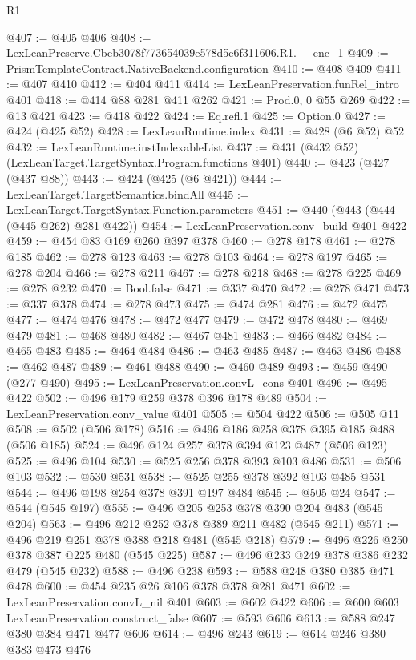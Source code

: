 \begin{lexlean}{R1}
\begin{coremodule}
@407 := @405 @406
@408 := LexLeanPreserve.Cbeb3078f773654039e578d5e6f311606.R1.__enc_1
@409 := PrismTemplateContract.NativeBackend.configuration
@410 := @408 @409
@411 := @407 @410
@412 := @404 @411
@414 := LexLeanPreservation.funRel_intro @401
@418 := @414 @88 @281 @411 @262
@421 := Prod.{0, 0} @55 @269
@422 := @13 @421
@423 := @418 @422
@424 := Eq.refl.{1}
@425 := Option.{0}
@427 := @424 (@425 @52)
@428 := LexLeanRuntime.index
@431 := @428 (@6 @52) @52
@432 := LexLeanRuntime.instIndexableList
@437 := @431 (@432 @52) (LexLeanTarget.TargetSyntax.Program.functions @401)
@440 := @423 (@427 (@437 @88))
@443 := @424 (@425 (@6 @421))
@444 := LexLeanTarget.TargetSemantics.bindAll
@445 := LexLeanTarget.TargetSyntax.Function.parameters
@451 := @440 (@443 (@444 (@445 @262) @281 @422))
@454 := LexLeanPreservation.conv_build @401 @422
@459 := @454 @83 @169 @260 @397 @378
@460 := @278 @178
@461 := @278 @185
@462 := @278 @123
@463 := @278 @103
@464 := @278 @197
@465 := @278 @204
@466 := @278 @211
@467 := @278 @218
@468 := @278 @225
@469 := @278 @232
@470 := Bool.false
@471 := @337 @470
@472 := @278 @471
@473 := @337 @378
@474 := @278 @473
@475 := @474 @281
@476 := @472 @475
@477 := @474 @476
@478 := @472 @477
@479 := @472 @478
@480 := @469 @479
@481 := @468 @480
@482 := @467 @481
@483 := @466 @482
@484 := @465 @483
@485 := @464 @484
@486 := @463 @485
@487 := @463 @486
@488 := @462 @487
@489 := @461 @488
@490 := @460 @489
@493 := @459 @490 (@277 @490)
@495 := LexLeanPreservation.convL_cons @401
@496 := @495 @422
@502 := @496 @179 @259 @378 @396 @178 @489
@504 := LexLeanPreservation.conv_value @401
@505 := @504 @422
@506 := @505 @11
@508 := @502 (@506 @178)
@516 := @496 @186 @258 @378 @395 @185 @488 (@506 @185)
@524 := @496 @124 @257 @378 @394 @123 @487 (@506 @123)
@525 := @496 @104
@530 := @525 @256 @378 @393 @103 @486
@531 := @506 @103
@532 := @530 @531
@538 := @525 @255 @378 @392 @103 @485 @531
@544 := @496 @198 @254 @378 @391 @197 @484
@545 := @505 @24
@547 := @544 (@545 @197)
@555 := @496 @205 @253 @378 @390 @204 @483 (@545 @204)
@563 := @496 @212 @252 @378 @389 @211 @482 (@545 @211)
@571 := @496 @219 @251 @378 @388 @218 @481 (@545 @218)
@579 := @496 @226 @250 @378 @387 @225 @480 (@545 @225)
@587 := @496 @233 @249 @378 @386 @232 @479 (@545 @232)
@588 := @496 @238
@593 := @588 @248 @380 @385 @471 @478
@600 := @454 @235 @26 @106 @378 @378 @281 @471
@602 := LexLeanPreservation.convL_nil @401
@603 := @602 @422
@606 := @600 @603 LexLeanPreservation.construct_false
@607 := @593 @606
@613 := @588 @247 @380 @384 @471 @477 @606
@614 := @496 @243
@619 := @614 @246 @380 @383 @473 @476

\end{coremodule}
\end{lexlean}
